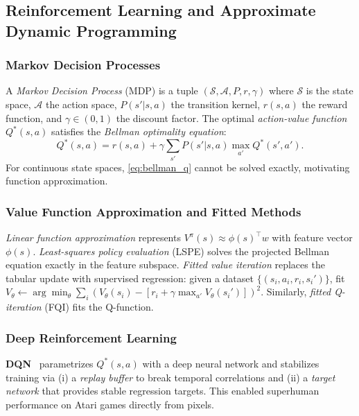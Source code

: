 \documentclass[letterpaper, 10pt, conference]{ieeeconf}
\begin{document}
\subsection{Reinforcement Learning and Approximate Dynamic Programming}
\label{sec:rl}

\subsubsection{Markov Decision Processes}
A \emph{Markov Decision Process} (MDP) is a tuple
$(\mathcal{S},\mathcal{A},P,r,\gamma)$ where $\mathcal{S}$ is the state space,
$\mathcal{A}$ the action space, $P(s'|s,a)$ the transition kernel,
$r(s,a)$ the reward function, and $\gamma\in(0,1)$ the discount factor.
The optimal \emph{action-value function} $Q^*(s,a)$ satisfies the
\emph{Bellman optimality equation}:
\begin{equation}
  Q^*(s,a) = r(s,a) + \gamma\sum_{s'}P(s'|s,a)\max_{a'}Q^*(s',a').
  \label{eq:bellman_q}
\end{equation}
For continuous state spaces, \eqref{eq:bellman_q} cannot be solved exactly,
motivating function approximation.

\subsubsection{Value Function Approximation and Fitted Methods}
\emph{Linear function approximation} represents $V^\pi(s)\approx\phi(s)^\top w$
with feature vector $\phi(s)$.  \emph{Least-squares policy evaluation} (LSPE)
solves the projected Bellman equation exactly in the feature subspace.
\emph{Fitted value iteration} replaces the tabular update with supervised
regression: given a dataset $\{(s_i,a_i,r_i,s_i')\}$, fit
$V_{\theta}\leftarrow\arg\min_\theta\sum_i(V_\theta(s_i) - [r_i + \gamma\max_{a'}V_\theta(s_i')])^2$.
Similarly, \emph{fitted Q-iteration} (FQI) fits the Q-function.

\subsubsection{Deep Reinforcement Learning}
\textbf{DQN}~\cite{mnih2015dqn} parametrizes $Q^*(s,a)$ with a deep neural
network and stabilizes training via (i) a \emph{replay buffer} to break temporal
correlations and (ii) a \emph{target network} that provides stable regression
targets.  This enabled superhuman performance on Atari games directly from pixels.
\end{document}
